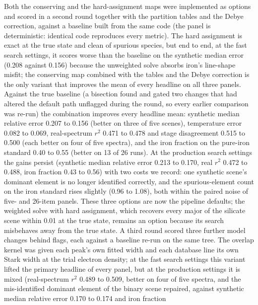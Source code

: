 Both the conserving and the hard-assignment maps were implemented as options and scored in a
second round together with the partition tables and the Debye correction, against a baseline built
from the same code (the panel is deterministic: identical code reproduces every metric). The
hard assignment is exact at the true state and clean of spurious species, but end to end, at the
fast search settings, it scores worse than the baseline on the synthetic median error (0.208 against
0.156) because the unweighted solve absorbs iron's line-shape misfit; the conserving map combined
with the tables and the Debye correction is the only variant that improves the mean of every
headline on all three panels. %
Against the true baseline (a bisection found and gated two changes that had altered the default
path unflagged during the round, so every earlier comparison was re-run) the combination improves
every headline mean: synthetic median relative error 0.207 to 0.156 (better on three of five
scenes), temperature error 0.082 to 0.069, real-spectrum $r^2$ 0.471 to 0.478 and stage
disagreement 0.515 to 0.500 (each better on four of five spectra), and the iron fraction on the
pure-iron standard 0.40 to 0.55 (better on 13 of 26 runs). At the production search settings
the gains persist (synthetic median relative error 0.213 to 0.170, real $r^2$ 0.472 to 0.488,
iron fraction 0.43 to 0.56) with two costs we record: one synthetic scene's dominant element is
no longer identified correctly, and the spurious-element count on the iron standard rises
slightly (0.96 to 1.08), both within the paired noise of five- and 26-item panels. %
These three options are now the pipeline defaults; the weighted solve with hard assignment, which
recovers every major of the silicate scene within 0.01 at the true state, remains an option
because its search misbehaves away from the true state.
A third round scored three further model changes behind flags, each against a baseline re-run on
the same tree. The overlap kernel was given each peak's own fitted width and each database line
its own Stark width at the trial electron density; at the fast search settings this variant lifted
the primary headline of every panel, but at the production settings it is mixed (real-spectrum
$r^2$ 0.489 to 0.509, better on four of five spectra, and the mis-identified dominant element of
the binary scene repaired, against synthetic median relative error 0.170 to 0.174 and iron fraction
